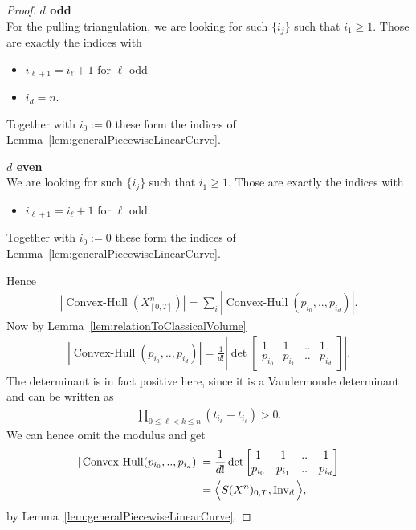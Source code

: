 \documentclass{scrartcl}
\theoremstyle{plain}
\theoremstyle{definition}
\newcommand{\1}[1]{1_{\{#1\}}}
\newcommand{\ds}{d} %
\begin{document}
\begin{proof}
  \textbf{$\ds$ odd}\\
  For the pulling triangulation, we are looking for such $\{i_j\}$ such that $i_1 \ge 1$.
  Those are exactly the indices with
  \begin{itemize}
    \item $i_{\ell+1} = i_\ell + 1$ for $\ell$ odd
    \item $i_\ds = n$.
  \end{itemize}
  Together with $i_0 := 0$ these form the indices of Lemma~\ref{lem:generalPiecewiseLinearCurve}.


  \textbf{$\ds$ even}\\
  We are looking for such $\{i_j\}$ such that $i_1 \ge 1$.
  Those are exactly the indices with
  \begin{itemize}
    \item $i_{\ell+1} = i_\ell + 1$ for $\ell$ odd.
  \end{itemize}
  Together with $i_0 := 0$ these form the indices of Lemma~\ref{lem:generalPiecewiseLinearCurve}.

  Hence
  \begin{align*}
    |\operatorname{Convex-Hull}( X^n_{[0,T]} )|
    =
    \sum_i |\operatorname{Convex-Hull}( p_{i_0}, .., p_{i_\ds} )|.
  \end{align*}
  Now by Lemma~\ref{lem:relationToClassicalVolume}
  \begin{align*}
    |\operatorname{Convex-Hull}( p_{i_0}, .., p_{i_\ds} )|
    =
    \frac{1}{\ds!}
    \left|
    \det\left[
      \begin{matrix}
        1 & 1 & .. & 1 \\
        p_{i_0} & p_{i_1} & .. & p_{i_\ds}
      \end{matrix}
    \right]
    \right|.
  \end{align*}
  The determinant is in fact positive here, since
  it is a Vandermonde determinant and can be written as
  \begin{align*}
    \prod_{0\le \ell < k \le n} ( t_{i_k} - t_{i_\ell} ) > 0.
  \end{align*}
  We can hence omit the modulus and get
  \begin{align*}
    |\operatorname{Convex-Hull}( p_{i_0}, .., p_{i_\ds} )|
    &=
    \frac{1}{\ds!}
    \det\left[
      \begin{matrix}
        1 & 1 & .. & 1 \\
        p_{i_0} & p_{i_1} & .. & p_{i_\ds}
      \end{matrix}
    \right] \\
    &=
    \Big\langle S(X^n)_{0,T}, \firstInvariant\ds \Big\rangle,
  \end{align*}
  by Lemma~\ref{lem:generalPiecewiseLinearCurve}.


\end{proof}
\end{document}
